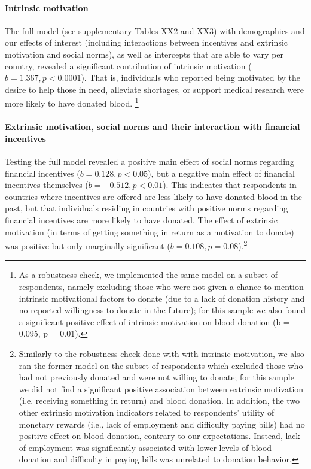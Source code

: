 \documentclass[AER]{AEA}
\begin{document}
\paragraph{Intrinsic motivation}

The full model (see supplementary Tables XX2 and XX3) with demographics and our effects of interest (including interactions between incentives and extrinsic motivation and social norms), as well as intercepts that are able to vary per country, revealed a significant contribution of intrinsic motivation ($b = 1.367, p < 0.0001$). That is, individuals who reported being motivated by the desire to help those in need, alleviate shortages, or support medical research were more likely to have donated blood. \footnote{As a robustness check, we implemented the same model on a subset of respondents, namely excluding those who were not given a chance to mention intrinsic motivational factors to donate (due to a lack of donation history and no reported willingness to donate in the future); for this sample we also found a significant positive effect of intrinsic motivation on blood donation (b = 0.095, p = 0.01).}

\paragraph{Extrinsic motivation, social norms and their interaction with financial incentives}

Testing the full model revealed a positive main effect of social norms regarding financial incentives ($b = 0.128, p < 0.05$), but a negative main effect of financial incentives themselves ($b = -0.512, p < 0.01$). This indicates that respondents in countries where incentives are offered are less likely to have donated blood in the past, but that individuals residing in countries with positive norms regarding financial incentives are more likely to have donated. The effect of extrinsic motivation (in terms of getting something in return as a motivation to donate) was positive but only marginally significant ($b = 0.108, p = 0.08$).\footnote{Similarly to the robustness check done with with intrinsic motivation, we also ran the former model on the subset of respondents which excluded those who had not previously donated and were not willing to donate; for this sample we did not find a significant positive association between extrinsic motivation (i.e. receiving something in return) and blood donation. In addition, the two other extrinsic motivation indicators related to respondents’ utility of monetary rewards (i.e., lack of employment and difficulty paying bills) had no positive effect on blood donation, contrary to our expectations. Instead, lack of employment was significantly associated with lower levels of blood donation and difficulty in paying bills was unrelated to donation behavior.}
\end{document}
